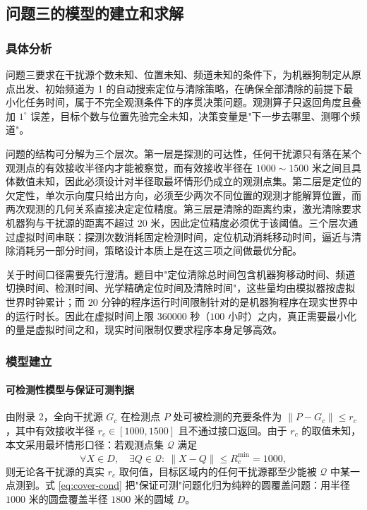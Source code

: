 
\subsection{问题三的模型的建立和求解}
\subsubsection{具体分析}

问题三要求在干扰源个数未知、位置未知、频道未知的条件下，为机器狗制定从原点出发、初始频道为 1 的自动搜索定位与清除策略，在确保全部清除的前提下最小化任务时间，属于不完全观测条件下的序贯决策问题。观测算子只返回角度且叠加 $1^\circ$ 误差，目标个数与位置先验完全未知，决策变量是"下一步去哪里、测哪个频道"。

问题的结构可分解为三个层次。第一层是探测的可达性，任何干扰源只有落在某个观测点的有效接收半径内才能被察觉，而有效接收半径在 $1000\sim1500$ 米之间且具体数值未知，因此必须设计对半径取最坏情形仍成立的观测点集。第二层是定位的欠定性，单次示向度只给出方向，必须至少两次不同位置的观测才能解算位置，而两次观测的几何关系直接决定定位精度。第三层是清除的距离约束，激光清除要求机器狗与干扰源的距离不超过 $20$ 米，因此定位精度必须优于该阈值。三个层次通过虚拟时间串联：探测次数消耗固定检测时间，定位机动消耗移动时间，逼近与清除消耗另一部分时间，策略设计本质上是在这三项之间做最优分配。

关于时间口径需要先行澄清。题目中"定位清除总时间包含机器狗移动时间、频道切换时间、检测时间、光学精确定位时间及清除时间"，这些量均由模拟器按虚拟世界时钟累计；而 $20$ 分钟的程序运行时间限制针对的是机器狗程序在现实世界中的运行时长。因此在虚拟时间上限 $360000$ 秒（$100$ 小时）之内，真正需要最小化的量是虚拟时间之和，现实时间限制仅要求程序本身足够高效。

\subsubsection{模型建立}

\paragraph{可检测性模型与保证可测判据} 由附录 2，全向干扰源 $G_c$ 在检测点 $P$ 处可被检测的充要条件为 $\lVert P-G_c\rVert\le r_c$，其中有效接收半径 $r_c\in[1000,1500]$ 且不通过接口返回。由于 $r_c$ 的取值未知，本文采用最坏情形口径：若观测点集 $\mathcal Q$ 满足
\begin{equation}
\forall X\in D,\quad \exists Q\in\mathcal Q:\ \lVert X-Q\rVert\le R_c^{\min}=1000,
\label{eq:cover-cond}
\end{equation}
则无论各干扰源的真实 $r_c$ 取何值，目标区域内的任何干扰源都至少能被 $\mathcal Q$ 中某一点测到。式 \eqref{eq:cover-cond} 把"保证可测"问题化归为纯粹的圆覆盖问题：用半径 $1000$ 米的圆盘覆盖半径 $1800$ 米的圆域 $D$。

